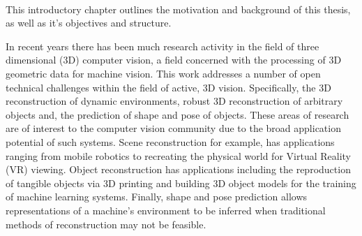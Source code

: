 ~\label{chap:intro}
\begin{chapterabstract}
This introductory chapter outlines the motivation and background of this thesis, as well as it's objectives 
and structure.
\end{chapterabstract}

In recent years there has been much research activity in the field of three dimensional (3D) computer vision, 
a field concerned with the processing of 3D geometric data for machine vision. This work addresses a number of 
open technical challenges within the field of active, 3D vision. Specifically, the 3D reconstruction of dynamic 
environments, robust 3D reconstruction of arbitrary objects and, the prediction of shape and pose of objects. These 
areas of research are of interest to the computer vision community due to the broad application potential of such 
systems. Scene reconstruction for example, has applications ranging from mobile robotics to recreating the physical 
world for Virtual Reality (VR) viewing. Object reconstruction has applications including the reproduction of tangible 
objects via 3D printing and building 3D object models for the training of machine learning systems. Finally, shape 
and pose prediction allows representations of a machine's environment to be inferred when traditional methods of 
reconstruction may not be feasible.

